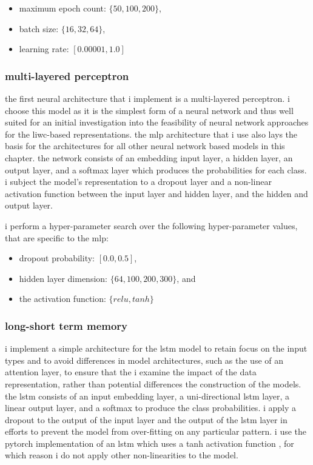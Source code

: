 \begin{itemize}
  \item maximum epoch count: $\{50, 100, 200\}$,
  \item batch size: $\{16, 32, 64\}$,
  \item learning rate: $[0.00001, 1.0]$
\end{itemize}

\subsubsection{multi-layered perceptron}

the first neural architecture that i implement is a multi-layered perceptron.
i choose this model as it is the simplest form of a neural network and thus well suited for an initial investigation into the feasibility of neural network approaches for the liwc-based representations.
the mlp architecture that i use also lays the basis for the architectures for all other neural network based models in this chapter. 
the network consists of an embedding input layer, a hidden layer, an output layer, and a softmax layer which produces the probabilities for each class. 
i subject the model's representation to a dropout layer and a non-linear activation function between the input layer and hidden layer, and the hidden and output layer.

i perform a hyper-parameter search over the following hyper-parameter values, that are specific to the mlp:

\begin{itemize}
  \item dropout probability: $[0.0, 0.5]$,
  \item hidden layer dimension: $\{64, 100, 200, 300\}$, and
  \item the activation function: $\{relu, tanh\}$
\end{itemize}

\subsubsection{long-short term memory}
i implement a simple architecture for the lstm model to retain focus on the input types and to avoid differences in model architectures, such as the use of an attention layer, to ensure that the i examine the impact of the data representation, rather than potential differences the construction of the models.
the lstm consists of an input embedding layer, a uni-directional lstm layer, a linear output layer, and a softmax to produce the class probabilities.
i apply a dropout to the output of the input layer and the output of the lstm layer in efforts to prevent the model from over-fitting on any particular pattern. 
i use the pytorch implementation of an lstm which uses a tanh activation function \citep{paszke:2019}, for which reason i do not apply other non-linearities to the model.


